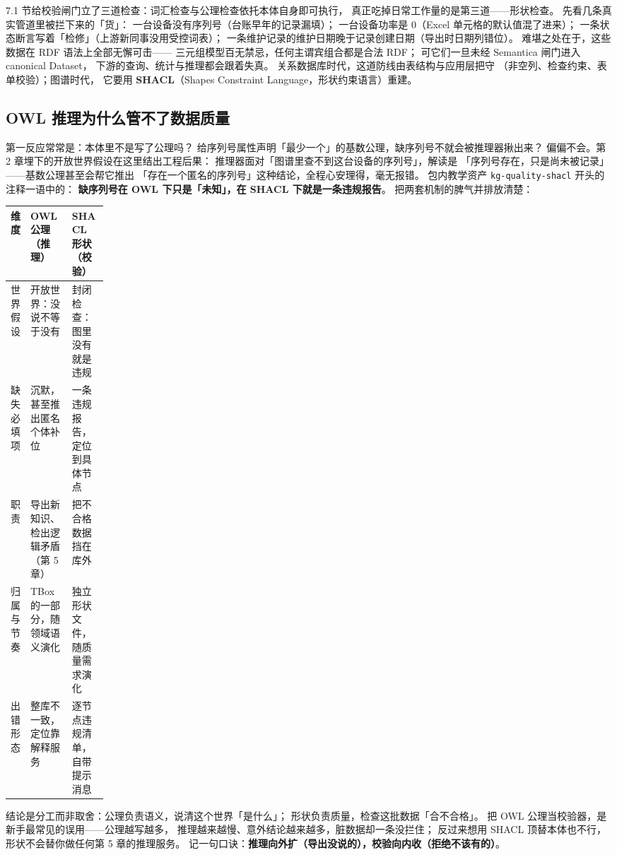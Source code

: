 7.1 节给校验闸门立了三道检查：词汇检查与公理检查依托本体自身即可执行，
真正吃掉日常工作量的是第三道——形状检查。
先看几条真实管道里被拦下来的「货」：
一台设备没有序列号（台账早年的记录漏填）；
一台设备功率是 0（Excel 单元格的默认值混了进来）；
一条状态断言写着「检修」（上游新同事没用受控词表）；
一条维护记录的维护日期晚于记录创建日期（导出时日期列错位）。
难堪之处在于，这些数据在 RDF 语法上全部无懈可击——
三元组模型百无禁忌，任何主谓宾组合都是合法 RDF；
可它们一旦未经 Semantica 闸门进入 canonical Dataset，
下游的查询、统计与推理都会跟着失真。
关系数据库时代，这道防线由表结构与应用层把守
（非空列、检查约束、表单校验）；图谱时代，
它要用 \textbf{SHACL}（Shapes Constraint Language，形状约束语言）重建。

\subsection{OWL 推理为什么管不了数据质量}

第一反应常常是：本体里不是写了公理吗？
给序列号属性声明「最少一个」的基数公理，缺序列号不就会被推理器揪出来？
偏偏不会。第 2 章埋下的开放世界假设在这里结出工程后果：
推理器面对「图谱里查不到这台设备的序列号」，解读是
「序列号存在，只是尚未被记录」——基数公理甚至会帮它推出
「存在一个匿名的序列号」这种结论，全程心安理得，毫无报错。
包内教学资产 \texttt{kg-quality-shacl} 开头的注释一语中的：
\textbf{缺序列号在 OWL 下只是「未知」，在 SHACL 下就是一条违规报告}。
把两套机制的脾气并排放清楚：

\begin{center}
\begin{tabularx}{\linewidth}{@{}p{0.16\linewidth}XX@{}}
\toprule
\textbf{维度} & \textbf{OWL 公理（推理）} & \textbf{SHACL 形状（校验）} \\
\midrule
世界假设 & 开放世界：没说不等于没有 & 封闭检查：图里没有就是违规 \\
缺失必填项 & 沉默，甚至推出匿名个体补位 & 一条违规报告，定位到具体节点 \\
职责 & 导出新知识、检出逻辑矛盾（第 5 章） & 把不合格数据挡在库外 \\
归属与节奏 & TBox 的一部分，随领域语义演化 & 独立形状文件，随质量需求演化 \\
出错形态 & 整库不一致，定位靠解释服务 & 逐节点违规清单，自带提示消息 \\
\bottomrule
\end{tabularx}
\end{center}

结论是分工而非取舍：公理负责语义，说清这个世界「是什么」；
形状负责质量，检查这批数据「合不合格」。
把 OWL 公理当校验器，是新手最常见的误用——公理越写越多，
推理越来越慢、意外结论越来越多，脏数据却一条没拦住；
反过来想用 SHACL 顶替本体也不行，形状不会替你做任何第 5 章的推理服务。
记一句口诀：\textbf{推理向外扩（导出没说的），校验向内收（拒绝不该有的）}。

